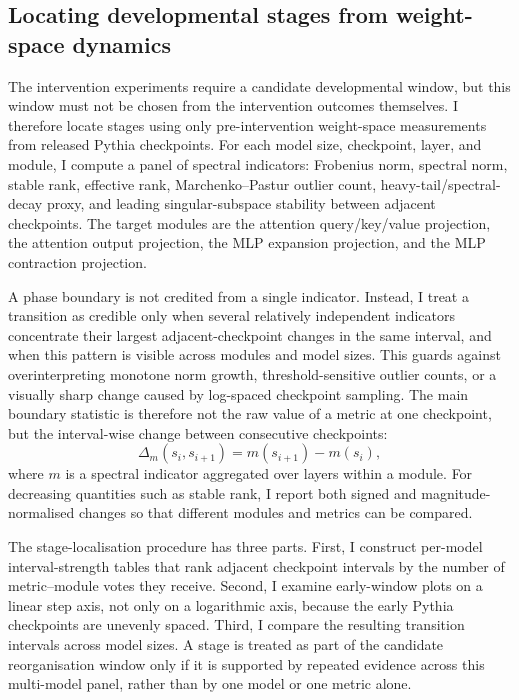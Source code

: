 \subsection{Locating developmental stages from weight-space dynamics}
\label{sec:method_stage_localisation}

The intervention experiments require a candidate developmental window, but this window must not be chosen from the intervention outcomes themselves. I therefore locate stages using only pre-intervention weight-space measurements from released Pythia checkpoints. For each model size, checkpoint, layer, and module, I compute a panel of spectral indicators: Frobenius norm, spectral norm, stable rank, effective rank, Marchenko--Pastur outlier count, heavy-tail/spectral-decay proxy, and leading singular-subspace stability between adjacent checkpoints. The target modules are the attention query/key/value projection, the attention output projection, the MLP expansion projection, and the MLP contraction projection.

A phase boundary is not credited from a single indicator. Instead, I treat a transition as credible only when several relatively independent indicators concentrate their largest adjacent-checkpoint changes in the same interval, and when this pattern is visible across modules and model sizes. This guards against overinterpreting monotone norm growth, threshold-sensitive outlier counts, or a visually sharp change caused by log-spaced checkpoint sampling. The main boundary statistic is therefore not the raw value of a metric at one checkpoint, but the interval-wise change between consecutive checkpoints:
\[
    \Delta_m(s_i,s_{i+1}) = m(s_{i+1}) - m(s_i),
\]
where \(m\) is a spectral indicator aggregated over layers within a module. For decreasing quantities such as stable rank, I report both signed and magnitude-normalised changes so that different modules and metrics can be compared.

The stage-localisation procedure has three parts. First, I construct per-model interval-strength tables that rank adjacent checkpoint intervals by the number of metric--module votes they receive. Second, I examine early-window plots on a linear step axis, not only on a logarithmic axis, because the early Pythia checkpoints are unevenly spaced. Third, I compare the resulting transition intervals across model sizes. A stage is treated as part of the candidate reorganisation window only if it is supported by repeated evidence across this multi-model panel, rather than by one model or one metric alone.

